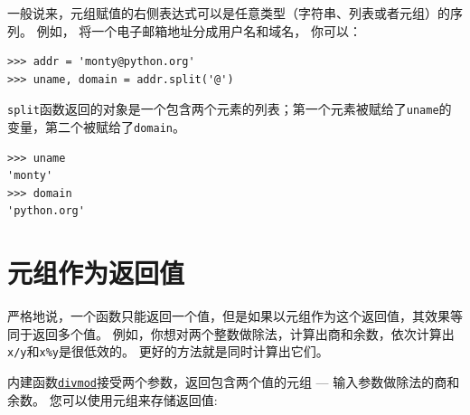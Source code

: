 一般说来，元组赋值的右侧表达式可以是任意类型（字符串、列表或者元组）的序列。 例如， 将一个电子邮箱地址分成用户名和域名， 你可以：

  

\begin{lstlisting}
>>> addr = 'monty@python.org'
>>> uname, domain = addr.split('@')
\end{lstlisting}

%

\lstinline{split}函数返回的对象是一个包含两个元素的列表；第一个元素被赋给了\lstinline{uname}的变量，第二个被赋给了\lstinline{domain}。

\begin{lstlisting}
>>> uname
'monty'
>>> domain
'python.org'
\end{lstlisting}
%

\section{元组作为返回值}
  


严格地说，一个函数只能返回一个值，但是如果以元组作为这个返回值，其效果等同于返回多个值。 例如，你想对两个整数做除法，计算出商和余数，依次计算出\lstinline{x/y}和\lstinline{x%y}是很低效的。 更好的方法就是同时计算出它们。


内建函数\href{https://docs.python.org/3/library/functions.html#divmod}{\lstinline{divmod}}接受两个参数，返回包含两个值的元组 --- 输入参数做除法的商和余数。 您可以使用元组来存储返回值:


